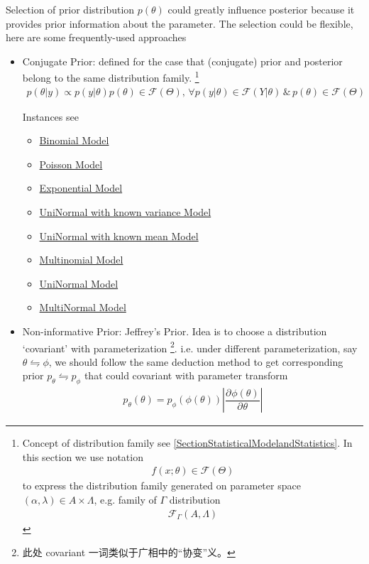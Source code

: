 Selection of prior distribution $ p(\theta ) $ could greatly influence posterior because it provides prior information about the parameter. The selection could be flexible, here are some frequently-used approaches
\begin{itemize}[topsep=2pt,itemsep=0pt]
    \item Conjugate Prior: defined for the case that (conjugate) prior and posterior belong to the same distribution family. 
    \footnote{Concept of distribution family see \autoref{SectionStatisticalModelandStatistics}. In this section we use notation 
    \begin{align}
        f(x;\theta )\in\mathscr{F}(\Theta) 
    \end{align}
    to express the distribution family generated on parameter space $ (\alpha ,\lambda )\in A\times \Lambda  $, e.g. family of $ \Gamma  $ distribution
    \begin{align}
        \mathscr{F}_\Gamma (A,\Lambda ) 
    \end{align}
    }
    \begin{align}
        p(\theta |y)\propto p(y|\theta)p(\theta)\in \mathscr{F}(\Theta ) ,\,\forall p(y|\theta)\in\mathscr{F}{(Y|\theta) } \,\&\, p(\theta )\in\mathscr{F}(\Theta ) 
    \end{align}

    Instances see 
    \begin{itemize}[topsep=2pt,itemsep=-1pt]
        \item \hyperlink{BinomConjugate}{Binomial Model}
        \item \hyperlink{PoissonConjugate}{Poisson Model}
        \item \hyperlink{ExpConjugate}{Exponential Model}
        \item \hyperlink{NormalWithVarConjugate}{UniNormal with known variance Model}
        \item \hyperlink{NormalWithMeanConjugate}{UniNormal with known mean Model}
        \item \hyperlink{MultinomConjugate}{Multinomial Model}
        \item \hyperlink{NormalConjugate}{UniNormal Model}
        \item \hyperlink{MultiNormalConjugate}{MultiNormal Model}
    \end{itemize}

    \item {}Non-informative Prior: Jeffrey's Prior. Idea is to choose a distribution `covariant' with parameterization \footnote{此处 covariant 一词类似于广相中的“协变”义。}. i.e. under different parameterization, say $ \theta \leftrightharpoons \phi $, we should follow the same deduction method to get corresponding prior $ p_\theta \leftrightharpoons p_\phi  $ that could covariant with parameter transform 
    \begin{align}
        p_\theta (\theta )=p_\phi (\phi (\theta ))\left| \dfrac{\partial^{} \phi(\theta )  }{\partial ^{} \theta } \right| 
    \end{align}
    

\end{itemize}
